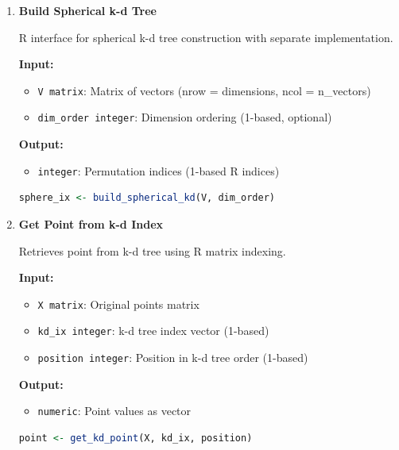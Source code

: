 \begin{enumerate}
\begin{enumerate}
            \item \textbf{Build Spherical k-d Tree}
                  
                  R interface for spherical k-d tree construction with separate implementation.
                  
                  \textbf{Input:}
                  \begin{itemize}
                    \item \texttt{V matrix}: Matrix of vectors (nrow = dimensions, ncol =
                          n\_vectors)
                          
                    \item \texttt{dim\_order integer}: Dimension ordering (1-based, optional)
                  \end{itemize}
                  \textbf{Output:}
                  \begin{itemize}
                    \item \texttt{integer}: Permutation indices (1-based R indices)
                  \end{itemize}
                  \begin{lstlisting}[language=R]
sphere_ix <- build_spherical_kd(V, dim_order)
                  \end{lstlisting}
                  
            \item \textbf{Get Point from k-d Index}
                  
                  Retrieves point from k-d tree using R matrix indexing.
                  
                  \textbf{Input:}
                  \begin{itemize}
                    \item \texttt{X matrix}: Original points matrix
                          
                    \item \texttt{kd\_ix integer}: k-d tree index vector (1-based)
                          
                    \item \texttt{position integer}: Position in k-d tree order (1-based)
                  \end{itemize}
                  \textbf{Output:}
                  \begin{itemize}
                    \item \texttt{numeric}: Point values as vector
                  \end{itemize}
                  \begin{lstlisting}[language=R]
point <- get_kd_point(X, kd_ix, position)
                  \end{lstlisting}
          \end{enumerate}
\end{enumerate}